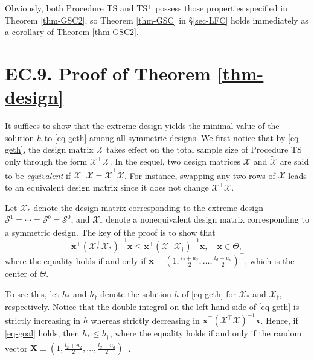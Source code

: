 \documentclass[ijoc,nonblindrev]{informs3}
\def\bx{{\bm x}}
\def\bX{{\bm X}}
\def\cX{{\mathcal X}}
\def\cS{{\mathcal{S}}}
\begin{document}
\begin{remark}
Obviously, both Procedure TS and TS$^+$ possess those properties specified in Theorem \ref{thm-GSC2}, so Theorem \ref{thm-GSC} in \S \ref{sec-LFC} holds immediately as a corollary of Theorem \ref{thm-GSC2}.
\end{remark}


\hypertarget{EC.9}{
\section*{EC.9. \hspace{5pt} Proof of Theorem \ref{thm-design}}
}

It suffices to show that the extreme design yields the minimal value of the solution $h$ to \eqref{eq-geth} among all symmetric designs.
We first notice that by \eqref{eq-geth}, the design matrix $\cX$ takes effect on the total sample size of Procedure TS only through the form $\cX^\intercal \cX$.
In the sequel, two design matrices $\cX$ and $\tilde\cX$ are said to be \emph{equivalent} if $\cX^\intercal \cX = \tilde\cX^\intercal \tilde\cX$.
For instance, swapping any two rows of $\cX$ leads to an equivalent design matrix since it does not change $\cX^\intercal \cX$.

Let $\cX_*$ denote the design matrix corresponding to the extreme design $\cS^1=\cdots =\cS^b = \cS^0$, and $\cX_\dag$ denote a nonequivalent design matrix corresponding to a symmetric design.
The key of the proof is to show that
\begin{equation}\label{eq-goal}
\bx^\intercal (\cX_*^\intercal \cX_*)^{-1} \bx \leq \bx^\intercal (\cX_\dag^\intercal \cX_\dag)^{-1} \bx, \quad \bx \in \Theta,
\end{equation}
where the equality holds if and only if $\bx = \left(1, \frac{l_2+u_2}{2},\ldots,\frac{l_d+u_d}{2} \right)^\intercal$, which is the center of $\Theta$.

To see this, let $h_*$ and $h_\dag$ denote the solution $h$ of \eqref{eq-geth} for $\cX_*$ and $\cX_\dag$, respectively.
Notice that the double integral on the left-hand side of \eqref{eq-geth} is strictly increasing in $h$ whereas strictly decreasing in $\bx^\intercal (\cX^\intercal \cX)^{-1} \bx$.
Hence, if \eqref{eq-goal} holds, then $h_* \leq h_\dag$, where the equality holds if and only if the random vector $\bX\equiv \left(1, \frac{l_2+u_2}{2},\ldots,\frac{l_d+u_d}{2} \right)^\intercal$.
\end{document}
